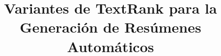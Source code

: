 \documentclass{llncs}
\begin{document}
\frontmatter
\pagestyle{headings}

\title{Variantes de TextRank para la Generación de Resúmenes Automáticos}

\maketitle
\end{document}
